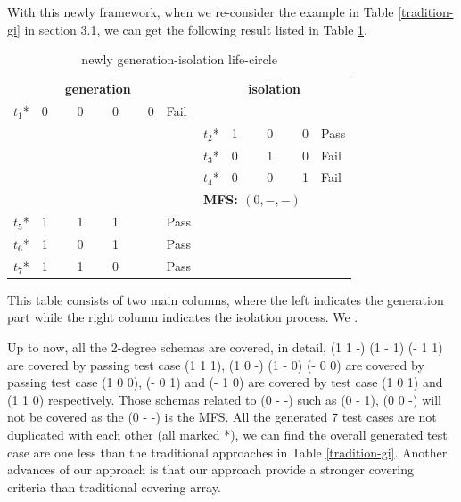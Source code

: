 \documentclass{sig-alternate}
\begin{document}


With this newly framework, when we re-consider the example in Table \ref{tradition-gi} in section 3.1,  we can get the following result listed in Table \ref{new-gi}.
\begin{table}[h]
\caption{newly generation-isolation life-circle}
\label{new-gi}
\center
\begin{tabular}{llllll|llllll}
 & \multicolumn{4}{c}{\bfseries generation}& & \multicolumn{6}{c}{\bfseries isolation} \\
$t_{1}$* & \multicolumn{4}{l}{0 \ \ \ \ 0 \ \ \ \  0  \ \ \ \  0 } & Fail & \multicolumn{6}{l}{}\\
\multicolumn{5}{l}{}& & $t_{2}$* &\multicolumn{4}{l}{1  \ \ \ \  0 \ \ \ \  0 }& Pass \\
\multicolumn{5}{l}{}& &$t_{3}$* &\multicolumn{4}{l}{0  \ \ \ \  1 \ \ \ \  0 } & Fail \\
\multicolumn{5}{l}{}& &$t_{4}$* &\multicolumn{4}{l}{0  \ \ \ \  0 \ \ \ \  1 } & Fail \\
\multicolumn{5}{l}{}& &\multicolumn{6}{l}{ \bfseries{MFS}: $(0, - , -)$ }  \\
$t_{5}$* &\multicolumn{4}{l}{1  \ \ \ \  1 \ \ \ \  1 } & Pass & \multicolumn{6}{l}{}\\
$t_{6}$* &\multicolumn{4}{l}{1  \ \ \ \  0 \ \ \ \  1 } & Pass & \multicolumn{6}{l}{}\\
$t_{7}$* &\multicolumn{4}{l}{1  \ \ \ \  1 \ \ \ \  0 } & Pass & \multicolumn{6}{l}{}\\
\end{tabular}
\end{table}

This table consists of two main columns, where the left indicates the generation part while the right column indicates the isolation process. We .

Up to now, all the 2-degree schemas are covered, in detail, (1  1 -) (1 - 1) (- 1 1) are covered by passing test case (1 1 1), (1 0 -) (1 - 0) (- 0 0) are covered by passing test case (1 0 0), (- 0 1) and (- 1 0) are covered by test case (1 0 1) and (1 1 0) respectively. Those schemas related to (0 - -) such as (0 - 1), (0 0 -) will not be covered as the (0 - -) is the MFS.  All the generated 7 test cases are not duplicated with each other (all marked *), we can find the overall generated test case are one less than the traditional approaches in Table \ref{tradition-gi}. Another advances of our approach is that our approach provide a stronger covering criteria than traditional covering array.
\end{document}
